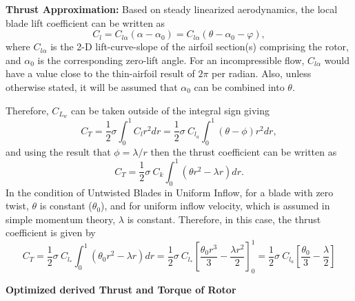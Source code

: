 \textbf{Thrust Approximation:} Based on steady linearized aerodynamics, the local blade lift coefficient can be written as
\begin{equation}
C_l = C_{l\alpha}(\alpha - \alpha_0) = C_{l\alpha}(\theta - \alpha_0 - \varphi),
\end{equation}
where $C_{l\alpha}$ is the 2-D lift-curve-slope of the airfoil section(s) comprising the rotor, and $\alpha_0$ is the corresponding zero-lift angle. For an incompressible flow, $C_{l\alpha}$ would have a value close to the thin-airfoil result of $2\pi$ per radian. Also, unless otherwise stated, it will be assumed that $\alpha_0$ can be combined into $\theta$.

Therefore, $C_{L_{w}}$ can be taken outside of the integral sign giving
\begin{equation}
    C_{T}=\frac{1}{2}\sigma\int_{0}^{1}C_{l}r^{2}dr=\frac{1}{2}\sigma~C_{l_{a}}\int_{0}^{1}(\theta-\phi)r^{2}dr,
\end{equation}
and using the result that $\phi=\lambda/r$ then the thrust coefficient can be written as
\begin{equation}
    C_{T}=\frac{1}{2}\sigma~C_{k}\int_{0}^{1}(\theta r^{2}-\lambda r)dr.
\end{equation}
In the condition of Untwisted Blades in Uniform Inflow, for a blade with zero twist, $\theta$ is constant ($\theta_0$), and for uniform inflow velocity, which is assumed in simple momentum theory, $\lambda$ is constant. Therefore, in this case, the thrust coefficient is given by
\begin{equation}
    C_{T}=\frac{1}{2}\sigma~C_{l_{*}}\int_{0}^{1}(\theta_{0}r^{2}-\lambda r)dr=\frac{1}{2}\sigma~C_{l_{*}}\left[\frac{\theta_{0}r^{3}}{3}-\frac{\lambda r^{2}}{2}\right]_{0}^{1}=\frac{1}{2}\sigma~C_{l_{a}}\left[\frac{\theta_{0}}{3}-\frac{\lambda}{2}\right]
\end{equation}

\textbf{Optimized derived Thrust and Torque of Rotor}

